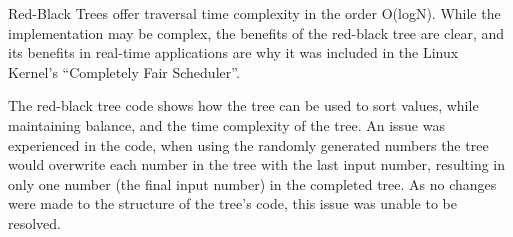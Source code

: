 Red-Black Trees offer traversal time complexity in the order O(logN). While the
implementation may be complex, the benefits of the red-black tree are clear, and
its benefits in real-time applications are why it was included in the Linux
Kernel's ``Completely Fair Scheduler''.

The red-black tree code shows how the tree can be used to sort values, while
maintaining balance, and the time complexity of the tree. An issue was
experienced in the code, when using the randomly generated numbers the tree
would overwrite each number in the tree with the last input number, resulting in
only one number (the final input number) in the completed tree. As no changes
were made to the structure of the tree's code, this issue was unable to be
resolved.

